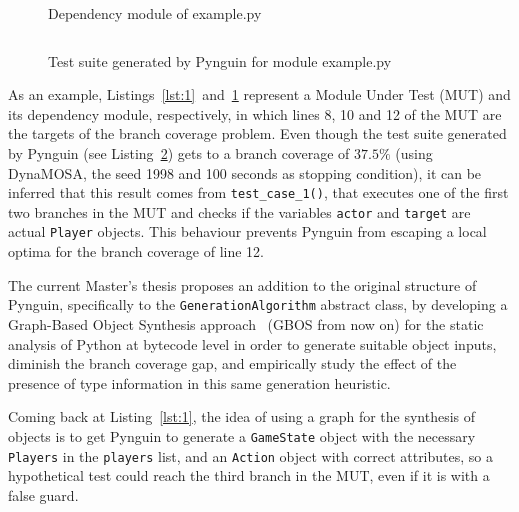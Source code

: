 \documentclass[%
  chapterprefix=false,%
  open=right,%
  twoside=true,%
  paper=a4,%
  logofile={Figures/logo.png},%
  thesistype=master,%
  UKenglish,%
]{se2thesis}
\newcommand{\classname}[1]{\texttt{#1}}
\begin{document}
\begin{figure}
\inputminted[linenos]{python}{Figures/dependencies.py}
\caption{Dependency module of example.py\label{lst:2}}
\end{figure}

\begin{figure}
  \inputminted[linenos]{python}{Figures/test1.py}
  \caption{Test suite generated by Pynguin for module example.py\label{lst:3}}
\end{figure}

As an example, Listings~\ref{lst:1}~and~\ref{lst:2} represent a Module Under Test (MUT) and its dependency module, respectively, in which lines 8, 10 and 12 of the MUT are the targets of the branch coverage problem.
Even though the test suite generated by Pynguin (see Listing~\ref{lst:3}) gets to a branch coverage of \(37.5\%\) (using DynaMOSA, the seed 1998 and 100 seconds as stopping condition), it can be inferred that this result comes from \verb|test_case_1()|, that executes one of the first two branches in the MUT and checks if the variables \verb|actor| and \verb|target| are actual \verb|Player| objects.
This behaviour prevents Pynguin from escaping a local optima for the branch coverage of line 12.

The current Master's thesis proposes an addition to the original structure of Pynguin, specifically to the \classname{GenerationAlgorithm} abstract class, by developing a Graph-Based Object Synthesis approach~\cite{DBLP:conf/sigsoft/0001O00D21} (GBOS from now on) for the static analysis of Python at bytecode level in order to generate suitable object inputs, diminish the branch coverage gap, and empirically study the effect of the presence of type information in this same generation heuristic.

Coming back at Listing~\ref{lst:1}, the idea of using a graph for the synthesis of objects is to get Pynguin to generate a \verb|GameState| object with the necessary \verb|Players| in the \verb|players| list, and an \verb|Action| object with correct attributes, so a hypothetical test could reach the third branch in the MUT, even if it is with a false guard.
\end{document}
